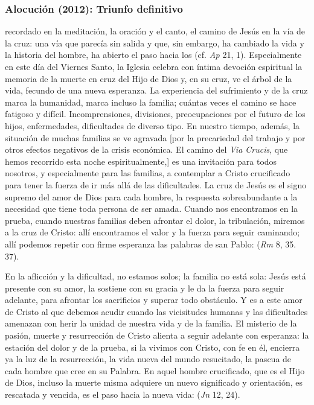 \newpage 
\subsubsection{Alocución (2012): Triunfo definitivo}


\begin{body}
 recordado en la meditación, la oración y el canto, el camino de Jesús en la vía de la cruz: una vía que parecía sin salida y que, sin embargo, ha cambiado la vida y la historia del hombre, ha abierto el paso hacia los  (cf.\textit{ Ap} 21, 1). Especialmente en este día del Viernes Santo, la Iglesia celebra con íntima devoción espiritual la memoria de la muerte en cruz del Hijo de Dios y, en su cruz, ve el árbol de la vida, fecundo de una nueva esperanza. La experiencia del sufrimiento y de la cruz marca la humanidad, marca incluso la familia; cuántas veces el camino se hace fatigoso y difícil. Incomprensiones, divisiones, preocupaciones por el futuro de los hijos, enfermedades, dificultades de diverso tipo. En nuestro tiempo, además, la situación de muchas familias se ve agravada [por la precariedad del trabajo y por otros efectos negativos de la crisis económica. El camino del \textit{Via Crucis}, que hemos recorrido esta noche espiritualmente,] es una invitación para todos nosotros, y especialmente para las familias, a contemplar a Cristo crucificado para tener la fuerza de ir más allá de las dificultades. La cruz de Jesús es el signo supremo del amor de Dios para cada hombre, la respuesta sobreabundante a la necesidad que tiene toda persona de ser amada. Cuando nos encontramos en la prueba, cuando nuestras familias deben afrontar el dolor, la tribulación, miremos a la cruz de Cristo: allí encontramos el valor y la fuerza para seguir caminando; allí podemos repetir con firme esperanza las palabras de san Pablo:  (\textit{Rm} 8, 35. 37).

En la aflicción y la dificultad, no estamos solos; la familia no está sola: Jesús está presente con su amor, la sostiene con su gracia y le da la fuerza para seguir adelante, para afrontar los sacrificios y superar todo obstáculo. Y es a este amor de Cristo al que debemos acudir cuando las vicisitudes humanas y las dificultades amenazan con herir la unidad de nuestra vida y de la familia. El misterio de la pasión, muerte y resurrección de Cristo alienta a seguir adelante con esperanza: la estación del dolor y de la prueba, si la vivimos con Cristo, con fe en él, encierra ya la luz de la resurrección, la vida nueva del mundo resucitado, la pascua de cada hombre que cree en su Palabra. En aquel hombre crucificado, que es el Hijo de Dios, incluso la muerte misma adquiere un nuevo significado y orientación, es rescatada y vencida, es el paso hacia la nueva vida:  (\textit{Jn} 12, 24). 


\end{body}
